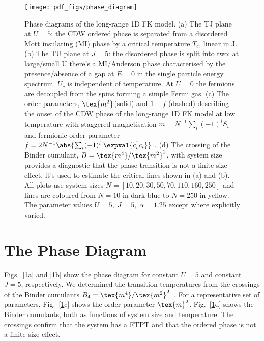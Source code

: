 \begin{figure}
\hypertarget{fig:phase_diagram}{%
\centering
\texttt{[image: pdf\_figs/phase\_diagram]}
\caption{Phase diagrams of the long-range 1D FK model. (a) The TJ plane at \(U = 5\): the {CDW} ordered phase is separated from a disordered Mott insulating (MI) phase by a critical temperature \(T_c\), linear in J. (b) The TU plane at \(J = 5\): the disordered phase is split into two: at large/small U there's a MI/Anderson phase characterised by the presence/absence of a gap at \(E=0\) in the single particle energy spectrum. \(U_c\) is independent of temperature. At \(U = 0\) the fermions are decoupled from the spins forming a simple Fermi gas. (c) The order parameters, \(\tex{m^2}\)(solid) and \(1 - f\) (dashed) describing the onset of the {CDW} phase of the long-range 1D {FK} model at low temperature with staggered magnetisation \(m = N^{-1} \sum_i (-1)^i S_i\) and fermionic order parameter \(f = 2 N^{-1}\abs{\sum_i (-1)^i \; \expval{c^\dag_{i}c_{i}}}\) . (d) The crossing of the Binder cumulant, \(B = \tex{m^4} / \tex{m^2}^2\), with system size provides a diagnostic that the phase transition is not a finite size effect, it's used to estimate the critical lines shown in (a) and (b). All plots use system sizes \(N = [10,20,30,50,70,110,160,250]\) and lines are coloured from \(N = 10\) in dark blue to \(N = 250\) in yellow. The parameter values \(U = 5,\;J = 5,\;\alpha = 1.25\) except where explicitly varied.}\label{fig:phase_diagram}
}
\end{figure}

\hypertarget{the-phase-diagram}{%
\section{The Phase Diagram}\label{the-phase-diagram}}

Figs.~{[}\protect\hyperlink{fig:phase_diagram}{1}a{]} and {[}\protect\hyperlink{fig:phase_diagram}{1}b{]} show the phase diagram for constant \(U=5\) and constant \(J=5\), respectively. We determined the transition temperatures from the crossings of the Binder cumulants \(B_4 = \tex{m^4}/\tex{m^2}^2\)~\autocite{binderFiniteSizeScaling1981}. For a representative set of parameters, Fig.~{[}\protect\hyperlink{fig:phase_diagram}{1}c{]} shows the order parameter \(\tex{m}^2\). Fig.~{[}\protect\hyperlink{fig:phase_diagram}{1}d{]} shows the Binder cumulants, both as functions of system size and temperature. The crossings confirm that the system has a FTPT and that the ordered phase is not a finite size effect.

